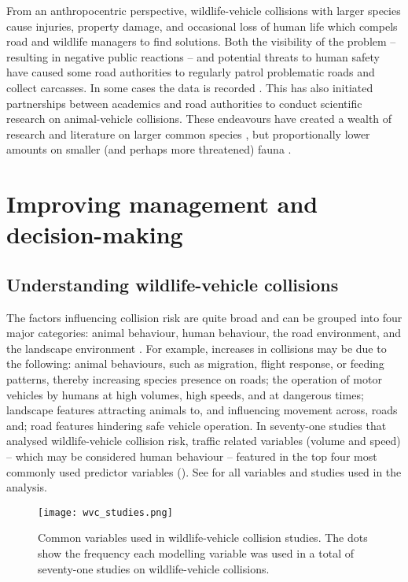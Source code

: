 From an anthropocentric perspective, wildlife-vehicle collisions with larger species cause injuries, property damage, and occasional loss of human life which compels road and wildlife managers to find solutions. Both the visibility of the problem -- resulting in negative public reactions -- and potential threats to human safety have caused some road authorities to regularly patrol problematic roads and collect carcasses. In some cases the data is recorded \citep{huij07a}. This has also initiated partnerships between academics and road authorities to conduct scientific research on animal-vehicle collisions.  These endeavours have created a wealth of research and literature on larger common species \citep[e.g.][]{biss08b,clev02,romi96,sudh09}, but proportionally lower amounts on smaller (and perhaps more threatened) fauna \citep[e.g.][]{clev03}.

\section{Improving management and decision-making}

\subsection{Understanding wildlife-vehicle collisions}

The factors influencing collision risk are quite broad and can be grouped into four major categories: animal behaviour, human behaviour, the road environment, and the landscape environment \citep{form03}. For example, increases in collisions may be due to the following: animal behaviours, such as migration, flight response, or feeding patterns, thereby increasing species presence on roads; the operation of motor vehicles by humans at high volumes, high speeds, and at dangerous times; landscape features attracting animals to, and influencing movement across, roads and; road features hindering safe vehicle operation. In seventy-one studies that analysed wildlife-vehicle collision risk, traffic related variables (volume and speed) -- which may be considered human behaviour -- featured in the top four most commonly used predictor variables (). See  for all variables and studies used in the analysis.

\begin{figure*}[!t]
  \centering
  \texttt{[image: wvc\_studies.png]}
  \caption[Variables used in wildlife-vehicle collision studies]{Common variables used in wildlife-vehicle collision studies. The dots show the frequency each modelling variable was used in a total of seventy-one studies on wildlife-vehicle collisions.}
  \label{wvc_studies}
\end{figure*}

